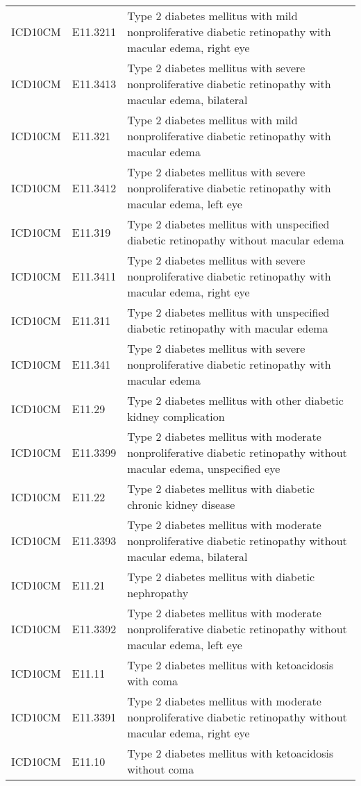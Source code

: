 \begin{table}[ht]
\begin{tabular}{lll}
  ICD10CM & E11.3211 & Type 2 diabetes mellitus with mild nonproliferative diabetic retinopathy with macular edema, right eye \\ 
  ICD10CM & E11.3413 & Type 2 diabetes mellitus with severe nonproliferative diabetic retinopathy with macular edema, bilateral \\ 
  ICD10CM & E11.321 & Type 2 diabetes mellitus with mild nonproliferative diabetic retinopathy with macular edema \\ 
  ICD10CM & E11.3412 & Type 2 diabetes mellitus with severe nonproliferative diabetic retinopathy with macular edema, left eye \\ 
  ICD10CM & E11.319 & Type 2 diabetes mellitus with unspecified diabetic retinopathy without macular edema \\ 
  ICD10CM & E11.3411 & Type 2 diabetes mellitus with severe nonproliferative diabetic retinopathy with macular edema, right eye \\ 
  ICD10CM & E11.311 & Type 2 diabetes mellitus with unspecified diabetic retinopathy with macular edema \\ 
  ICD10CM & E11.341 & Type 2 diabetes mellitus with severe nonproliferative diabetic retinopathy with macular edema \\ 
  ICD10CM & E11.29 & Type 2 diabetes mellitus with other diabetic kidney complication \\ 
  ICD10CM & E11.3399 & Type 2 diabetes mellitus with moderate nonproliferative diabetic retinopathy without macular edema, unspecified eye \\ 
  ICD10CM & E11.22 & Type 2 diabetes mellitus with diabetic chronic kidney disease \\ 
  ICD10CM & E11.3393 & Type 2 diabetes mellitus with moderate nonproliferative diabetic retinopathy without macular edema, bilateral \\ 
  ICD10CM & E11.21 & Type 2 diabetes mellitus with diabetic nephropathy \\ 
  ICD10CM & E11.3392 & Type 2 diabetes mellitus with moderate nonproliferative diabetic retinopathy without macular edema, left eye \\ 
  ICD10CM & E11.11 & Type 2 diabetes mellitus with ketoacidosis with coma \\ 
  ICD10CM & E11.3391 & Type 2 diabetes mellitus with moderate nonproliferative diabetic retinopathy without macular edema, right eye \\ 
  ICD10CM & E11.10 & Type 2 diabetes mellitus with ketoacidosis without coma \\ 

\end{tabular}
\end{table}
